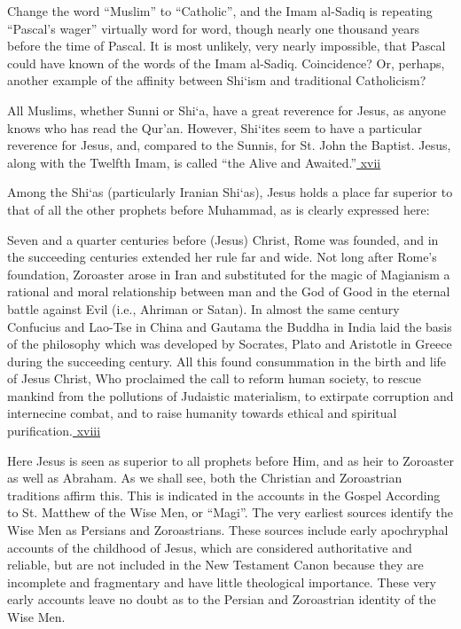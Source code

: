Change the word ``Muslim'' to ``Catholic'', and the Imam al-Sadiq is repeating ``Pascal's wager'' virtually word for word, though nearly one thousand years before the time of Pascal. It is most unlikely, very nearly impossible, that Pascal could have known of the words of the Imam al-Sadiq. Coincidence? Or, perhaps, another example of the affinity between Shi`ism and traditional Catholicism?

All Muslims, whether Sunni or Shi`a, have a great reverence for Jesus, as anyone knows who has read the Qur'an. However, Shi`ites seem to have a particular reverence for Jesus, and, compared to the Sunnis, for St. John the Baptist. Jesus, along with the Twelfth Imam, is called ``the Alive and Awaited.''\hyperref[_edn17]{ xvii }

Among the Shi`as (particularly Iranian Shi`as), Jesus holds a place far superior to that of all the other prophets before Muhammad, as is clearly expressed here:

\begin{quotex}
Seven and a quarter centuries before (Jesus) Christ, Rome was founded, and in the succeeding centuries extended her rule far and wide. Not long after Rome's foundation, Zoroaster arose in Iran and substituted for the magic of Magianism a rational and moral relationship between man and the God of Good in the eternal battle against Evil (i.e., Ahriman or Satan). In almost the same century Confucius and Lao-Tse in China and Gautama the Buddha in India laid the basis of the philosophy which was developed by Socrates, Plato and Aristotle in Greece during the succeeding century. All this found consummation in the birth and life of Jesus Christ, Who proclaimed the call to reform human society, to rescue mankind from the pollutions of Judaistic materialism, to extirpate corruption and internecine combat, and to raise humanity towards ethical and spiritual purification.\hyperref[_edn18]{ xviii }
\end{quotex}


Here Jesus is seen as superior to all prophets before Him, and as heir to Zoroaster as well as Abraham. As we shall see, both the Christian and Zoroastrian traditions affirm this. This is indicated in the accounts in the Gospel According to St. Matthew of the Wise Men, or ``Magi''. The very earliest sources identify the Wise Men as Persians and Zoroastrians. These sources include early apochryphal accounts of the childhood of Jesus, which are considered authoritative and reliable, but are not included in the New Testament Canon because they are incomplete and fragmentary and have little theological importance. These very early accounts leave no doubt as to the Persian and Zoroastrian identity of the Wise Men.

